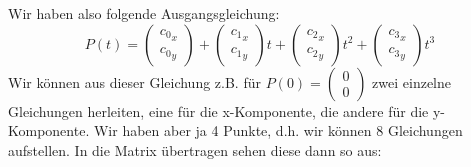 Wir haben also folgende Ausgangsgleichung:
\begin{displaymath}
P(t) = \begin{pmatrix} {c_0}_x \\ {c_0}_y \end{pmatrix} + \begin{pmatrix} {c_1}_x \\ {c_1}_y \end{pmatrix} t+ \begin{pmatrix} {c_2}_x \\ {c_2}_y \end{pmatrix} t^2+ \begin{pmatrix} {c_3}_x \\ {c_3}_y \end{pmatrix} t^3
\end{displaymath}
Wir können aus dieser Gleichung z.B. für \(P(0) = \begin{pmatrix} 0 \\ 0 \end{pmatrix}\) zwei einzelne Gleichungen herleiten, eine für die x-Komponente, die andere für die y-Komponente. Wir haben aber ja 4 Punkte, d.h. wir können 8 Gleichungen aufstellen. In die Matrix übertragen sehen diese dann so aus:

